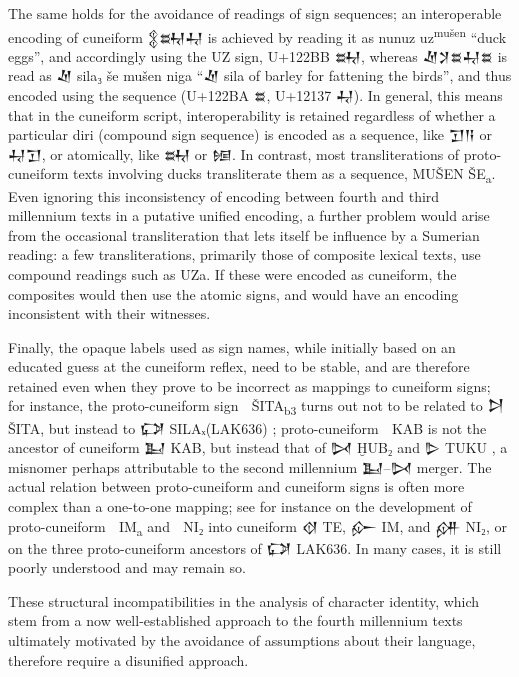 The same holds for the avoidance of readings of sign sequences; an
interoperable encoding of cunei\-form {\oraccnoto 𒉭𒊻𒄷} is achieved by
reading it as nunuz uz\textsuperscript{mušen} “duck eggs”, and
accordingly using the UZ sign, U+122BB {\oraccnoto 𒊻}, whereas
{\oraccnoto 𒑛𒋡𒊺𒄷𒊺} is read as {\oraccnoto 𒑛} sila₃ še mušen niga
“{\oraccnoto 𒑛} sila of barley for fattening the birds”, and thus
encoded using the sequence (U+122BA {\oraccnoto 𒊺}, U+12137
{\oraccnoto 𒄷}). In general, this means that in the cuneiform script,
interoperability is retained regardless of whether a particular diri
(compound sign sequence) is encoded as a sequence, like {\oraccnoto
𒋛𒀀} or {\oraccnoto 𒄷𒋛}, or atomically, like {\oraccnoto 𒊻} or
{\oraccnoto 𒎏}. In contrast, most transliterations of proto-cuneiform
texts involving ducks transliterate them as a sequence, MUŠEN
ŠE\textsubscript{a}. Even ignoring this inconsistency of encoding
between fourth and third millennium texts in a putative unified
encoding, a further problem would arise from the occasional
transliteration that lets itself be influence by a Sumerian reading: a
few transliterations, primarily those of composite lexical texts, use
compound readings such as UZa. If these were encoded as cuneiform, the
composites would then use the atomic signs, and would have an encoding
inconsistent with their witnesses.

Finally, the opaque labels used as sign names, while initially based
on an educated guess at the cuneiform reflex, need to be stable, and
are therefore retained even when they prove to be incorrect as
mappings to cuneiform signs; for instance, the proto-cuneiform sign
{\oraccpc 𒩁} ŠITA\textsubscript{b3} turns out not to be related to
{\oraccnoto 𒋖} ŠITA, but instead to {\oraccnoto 𒔌}
SILAₓ(LAK636) \cite[220]{Wagensonner2016}; proto-cuneiform {\oraccpc
𒡱} KAB is not the ancestor of cuneiform {\oraccnoto 𒆏} KAB, but
instead that of {\oraccnoto 𒄸} ḪUB₂ and {\oraccnoto 𒌇}
TUKU \cite[274]{Wagensonner2016}, a misnomer perhaps attributable to
the second millennium {\oraccnoto 𒆏}–{\oraccnoto 𒄸} merger. The actual
relation between proto-cuneiform and cuneiform signs is often more
complex than a one-to-one mapping; see for
instance \cite[217]{Wagensonner2016} on the development of
proto-cuneiform {\oraccpc 𒡡} IM\textsubscript{a} and {\oraccpc 𒥋} NI₂
into cuneiform {\oraccnoto 𒋼} TE, {\oraccnoto 𒅎} IM, and {\oraccnoto
𒉎} NI₂, or \cite[220]{Wagensonner2016} on the three proto-cuneiform
ancestors of {\oraccnoto 𒔌} LAK636. In many cases, it is still poorly
understood and may remain so.

These structural incompatibilities in the analysis of character
identity, which stem from a now well-established approach to the
fourth millennium texts ultimately motivated by the avoidance of
assumptions about their language, therefore require a disunified
approach.
